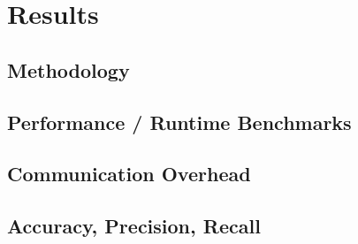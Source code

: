 \chapter{Results}
\section{Methodology}
\section{Performance / Runtime Benchmarks}
\section{Communication Overhead}
\section{Accuracy, Precision, Recall}
